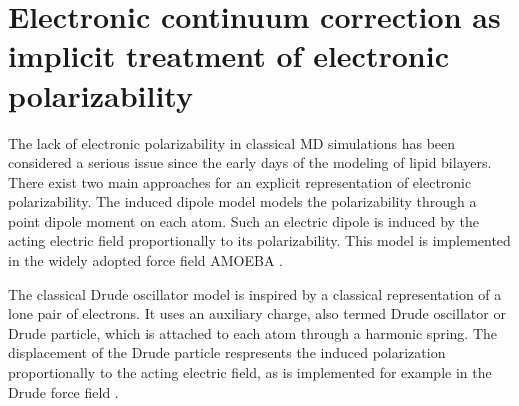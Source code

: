 \section{Electronic continuum correction as implicit treatment of electronic polarizability}
\label{section:ecc}

The lack of electronic polarizability in classical MD simulations
has been considered a serious issue since the early days of the modeling of lipid bilayers. 
There exist two main approaches for an explicit representation of electronic polarizability.
The induced dipole model models the polarizability through a point dipole moment on each atom.
Such an electric dipole is induced by the acting electric field proportionally to its polarizability. 
This model is implemented in the widely adopted force field AMOEBA \citep{amoeba06, amoeba10, amoeba13}.

The classical Drude oscillator model is inspired by a classical representation of a lone pair of electrons. 
It uses an auxiliary charge,
also termed Drude oscillator or Drude particle, 
which is attached to each atom through a harmonic spring.
The displacement of the Drude particle respresents the induced polarization proportionally to the acting electric field,
as is implemented for example in the Drude force field \citep{lemkul2016empirical}. 

